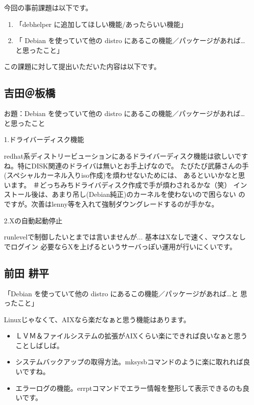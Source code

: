 \documentclass[mingoth,a4paper]{jsarticle}
\begin{document}

今回の事前課題は以下です。

\begin{enumerate}
 \item 「debhelper に追加してほしい機能/あったらいい機能」
 \item 「 Debian を使っていて他の distro にあるこの機能／パッケージがあれば…と思ったこと」
\end{enumerate}

この課題に対して提出いただいた内容は以下です。

\subsection{吉田＠板橋}

お題：Debian を使っていて他の distro にあるこの機能／パッケージがあれば…
と思ったこと

1.ドライバーディスク機能

redhat系ディストリービューションにあるドライバーディスク機能は欲しいです
ね。特にDISK関連のドライバは無いとお手上げなので。
たびたび武藤さんの手(スペシャルカーネル入りiso作成)を煩わせないためには、
あるといいかなと思います。
＃どっちみちドライバディスク作成で手が煩わされるかな（笑）
インストール後は、あまり吊し(Debian純正)のカーネルを使わないので困らない
のですが。次善はlenny等を入れて強制ダウングレードするのが手かな。

2.Xの自動起動停止

runlevelで制御したいとまでは言いませんが...
基本はXなしで速く、マウスなしでログイン
必要ならXを上げるというサーバっぽい運用が行いにくいです。


\subsection{前田 耕平}

「Debian を使っていて他の distro にあるこの機能／パッケージがあれば…と
思ったこと」

Linuxじゃなくて、AIXなら楽だなぁと思う機能はあります。

\begin{itemize}
 \item ＬＶＭ＆ファイルシステムの拡張がAIXくらい楽にできれば良いなぁと思うことしばしば。
 \item システムバックアップの取得方法。mksysbコマンドのように楽に取れれば良いですね。
 \item エラーログの機能。errptコマンドでエラー情報を整形して表示できるのも良いです。
\end{itemize}
\end{document}
